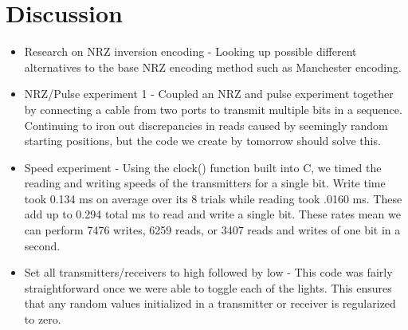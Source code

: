\documentclass{article}
\begin{document}
\section*{Discussion}
\begin{itemize}
\item Research on NRZ inversion encoding - Looking up possible different alternatives to the base NRZ encoding method such as Manchester encoding. 
\item NRZ/Pulse experiment 1 - Coupled an NRZ and pulse experiment together by connecting a cable from two ports to transmit multiple bits in a sequence. Continuing to iron out discrepancies in reads caused by seemingly random starting positions, but the code we create by tomorrow should solve this.
\item Speed experiment - Using the clock() function built into C, we timed the reading and writing speeds of the transmitters for a single bit. Write time took 0.134 ms on average over its 8 trials while reading took .0160 ms. These add up to 0.294 total ms to read and write a single bit. These rates mean we can perform 7476 writes, 6259 reads, or 3407 reads and writes of one bit in a second.
\item Set all transmitters/receivers to high followed by low - This code was fairly straightforward once we were able to toggle each of the lights. This ensures that any random values initialized in a transmitter or receiver is regularized to zero.

\end{itemize}
\end{document}
